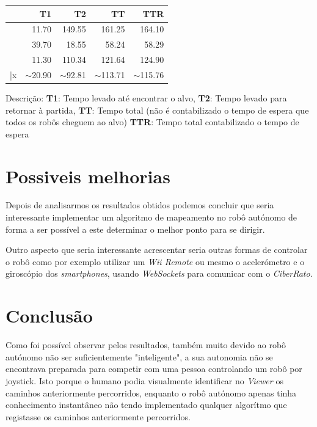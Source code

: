 \documentclass[conference]{IEEEtran}
\begin{document}
\begin{center}

    \begin{tabular}{ crrrr }
      \hline
      & T1 & T2 & TT & TTR \\
      \hline
      & 11.70 & 149.55 & 161.25 & 164.10 \\
      & 39.70 & 18.55 & 58.24 & 58.29 \\
      & 11.30 & 110.34 & 121.64 & 124.90 \\
      \hline
      \bar{x} & $\mathtt{\sim}$20.90 & $\mathtt{\sim}$92.81 & $\mathtt{\sim}$113.71 &  $\mathtt{\sim}$115.76\\
      \hline
    \end{tabular}
\end{center}

Descrição:
\textbf{T1}: Tempo levado até encontrar o alvo,
\textbf{T2}: Tempo levado para retornar à partida,
\textbf{TT}: Tempo total (não é contabilizado o tempo de espera que todos os robôs cheguem ao alvo)
\textbf{TTR}: Tempo total contabilizado o tempo de espera


\section{Possiveis melhorias}

Depois de analisarmos os resultados obtidos podemos concluir que seria interessante implementar um algoritmo de mapeamento no robô autónomo de forma a ser possível a este determinar o melhor ponto para se dirigir. 

Outro aspecto que seria interessante acrescentar seria outras formas de controlar o robô como por exemplo utilizar um \textit{Wii Remote} ou mesmo o acelerómetro e o giroscópio dos \textit{smartphones}, usando \textit{WebSockets} para comunicar com o \textit{CiberRato}.

\section{Conclusão}

Como foi possível observar pelos resultados, também muito devido ao robô autónomo não ser suficientemente "inteligente", a sua autonomia não se encontrava preparada para competir com uma pessoa controlando um robô por joystick. Isto porque o humano podia visualmente identificar no \textit{Viewer} os caminhos anteriormente percorridos, enquanto o robô autónomo apenas tinha conhecimento instantâneo  não tendo implementado qualquer algorítmo que registasse os caminhos anteriormente percorridos.
\end{document}
